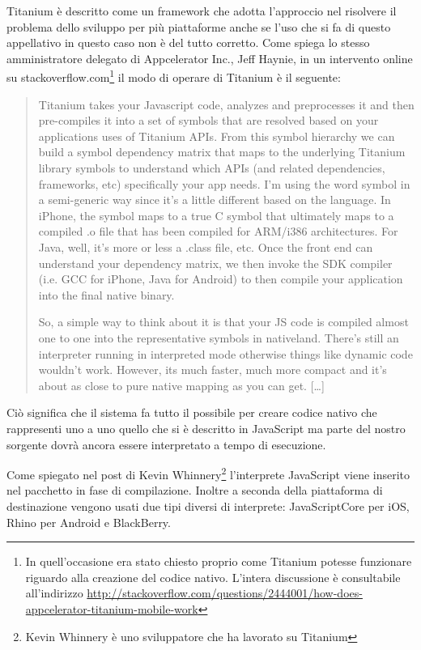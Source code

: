 			Titanium è descritto come un framework che adotta l'approccio 
			\crosscomp \citep{Web:peptechlearn.blogspot.it} nel risolvere il
			problema dello sviluppo per più 
			piattaforme anche se l'uso che si fa di questo appellativo in 
			questo caso non è del tutto corretto. Come spiega lo stesso 
			amministratore delegato di Appcelerator Inc., Jeff Haynie, in un intervento 
			online su \mbox{stackoverflow.com}\footnote{In quell'occasione era 
			stato chiesto proprio come Titanium potesse funzionare riguardo alla 
			creazione del codice nativo. L'intera discussione è consultabile 
			all'indirizzo 
			\url{http://stackoverflow.com/questions/2444001/how-does-appcelerator-titanium-mobile-work}}
			il modo di operare di Titanium è il seguente:
			\begin{quotation}
				Titanium takes your Javascript code, analyzes and preprocesses 
				it and then pre-compiles it into a set of symbols that are 
				resolved based on your applications uses of Titanium APIs. From 
				this symbol hierarchy we can build a symbol dependency matrix 
				that maps to the underlying Titanium library symbols to 
				understand which APIs (and related dependencies, frameworks, 
				etc) specifically your app needs. I'm using the word symbol in a 
				semi-generic way since it's a little different based on the 
				language. In iPhone, the symbol maps to a true C symbol that 
				ultimately maps to a compiled .o file that has been compiled for 
				ARM/i386 architectures. For Java, well, it's more or less a 
				.class file, etc. Once the front end can understand your 
				dependency matrix, we then invoke the SDK compiler (i.e. GCC for 
				iPhone, Java for Android) to then compile your application into 
				the final native binary.
				
				So, a simple way to think about it is that your JS code is 
				compiled almost one to one into the representative symbols in 
				nativeland. There's still an interpreter running in interpreted 
				mode otherwise things like dynamic code wouldn't work. However, 
				its much faster, much more compact and it's about as close to 
				pure native mapping as you can get. [\ldots]
			\end{quotation}
			Ciò significa che il sistema fa tutto il possibile per creare codice 
			nativo che rappresenti uno a uno quello che si è descritto in 
			JavaScript ma parte del nostro sorgente dovrà ancora essere 
			interpretato a tempo di esecuzione.
			
			Come spiegato nel post di Kevin Whinnery\footnote{Kevin Whinnery è uno 
			sviluppatore che ha lavorato su Titanium} l'interprete 
			JavaScript viene inserito nel pacchetto in fase di compilazione.
			Inoltre a seconda della piattaforma di destinazione vengono usati 
			due tipi diversi di interprete: JavaScriptCore per iOS, Rhino per 
			Android e BlackBerry.
			

